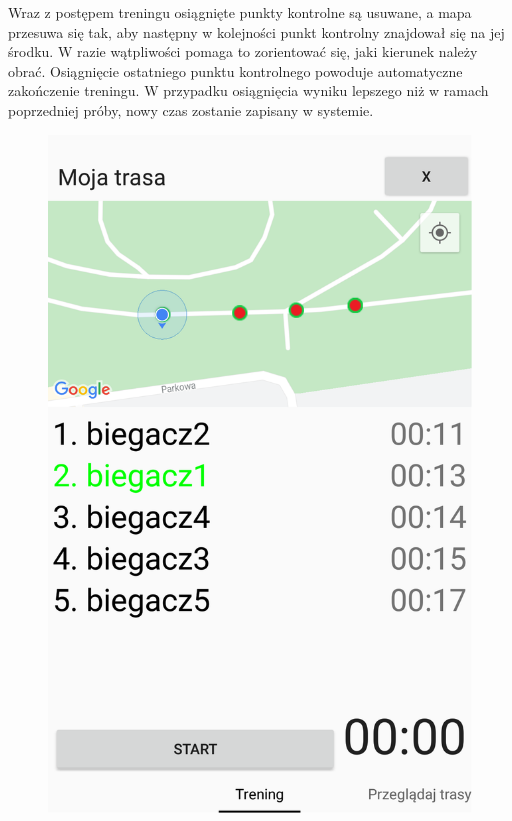 Wraz z postępem treningu osiągnięte punkty kontrolne są usuwane, a mapa przesuwa się tak, aby następny w kolejności punkt kontrolny znajdował się na jej środku. W razie wątpliwości pomaga to zorientować się, jaki kierunek należy obrać. Osiągnięcie ostatniego punktu kontrolnego powoduje automatyczne zakończenie treningu. W przypadku osiągnięcia wyniku lepszego niż w ramach poprzedniej próby, nowy czas zostanie zapisany w systemie.
\begin{figure}
\centering
\begin{minipage}{.5\textwidth}
  \centering
  \captionsetup{justification=centering}
  \includegraphics[width=.8\linewidth,frame]{img/rywalizacjaw1}
  \captionsetup{justification=centering}
  \label{image:rywalizacjaw1}
\end{minipage}%
\begin{minipage}{.5\textwidth}
  \centering
  \captionsetup{justification=centering}

\end{minipage}
\end{figure}
